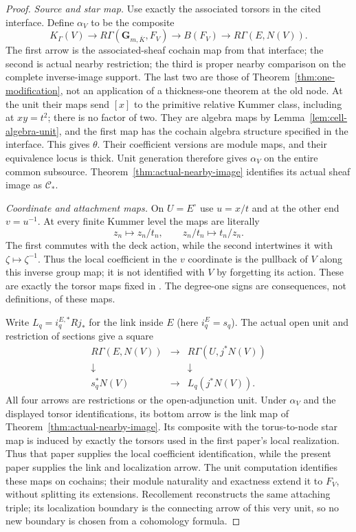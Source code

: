 \documentclass[11pt]{article}
\theoremstyle{definition}
\theoremstyle{remark}
\begin{document}
\begin{proof}
\emph{Source and star map.}
Use exactly the associated torsors in the cited interface.  Define
$\alpha_V$ to be the composite
\[
 K_\Gamma(V)\longrightarrow R\Gamma(\mathbf G_{m,\bar K},F_V)
 \longrightarrow B(F_V)\longrightarrow R\Gamma(E,N(V)).
\]
The first arrow is the associated-sheaf cochain map from that interface;
the second is actual nearby restriction; the third is proper nearby
comparison on the complete inverse-image support.  The last two are
those of Theorem~\ref{thm:one-modification}, not an application of a
thickness-one theorem at the old node.  At the unit their maps send
$[x]$ to the primitive relative Kummer class, including at $xy=t^2$;
there is no factor of two.  They are algebra maps by
Lemma~\ref{lem:cell-algebra-unit}, and the first map has the cochain
algebra structure specified in the interface.  This gives $\theta$.
Their coefficient versions are module maps, and their equivalence
locus is thick.  Unit generation therefore gives $\alpha_V$ on the
entire common subsource.  Theorem~\ref{thm:actual-nearby-image}
identifies its actual sheaf image as $\mathcal C_*$.

\emph{Coordinate and attachment maps.}
On $U=E^\circ$ use $u=x/t$ and at the other end $v=u^{-1}$.
At every finite Kummer level the maps are literally
\[
 z_n\longmapsto z_n/t_n,\qquad
 z_n/t_n\longmapsto t_n/z_n.
\]
The first commutes with the deck action, while the second intertwines
it with $\zeta\mapsto\zeta^{-1}$.  Thus the local coefficient in the
$v$ coordinate is the pullback of $V$ along this inverse group map;
it is not identified with $V$ by forgetting its action.  These are
exactly the torsor maps fixed in \cite{LocalThreeRealizations}.
The degree-one signs are consequences, not definitions, of these maps.

Write $L_q=i_q^{E,*}Rj_*$ for the link inside $E$ (here $i_q^E=s_q$).
The actual open unit and restriction of sections give a square
\[
\begin{array}{ccc}
 R\Gamma(E,N(V))&\longrightarrow&R\Gamma(U,j^*N(V))\\
 \downarrow&&\downarrow\\
 s_q^*N(V)&\longrightarrow&L_q(j^*N(V)).
\end{array}
\]
All four arrows are restrictions or the open-adjunction unit.
Under $\alpha_V$ and the displayed torsor identifications, its
bottom arrow is the link map of Theorem~\ref{thm:actual-nearby-image}.
Its composite with the torus-to-node star map is induced by exactly
the torsors used in the first paper's local realization.  Thus that
paper supplies the local coefficient identification, while the
present paper supplies the link and localization arrow.
The unit computation identifies these maps on cochains; their module
naturality and exactness extend it to $F_V$, without splitting its
extensions.  Recollement reconstructs the same attaching triple;
its localization boundary is the connecting arrow of this very
unit, so no new boundary is chosen from a cohomology formula.


\end{proof}
\end{document}
